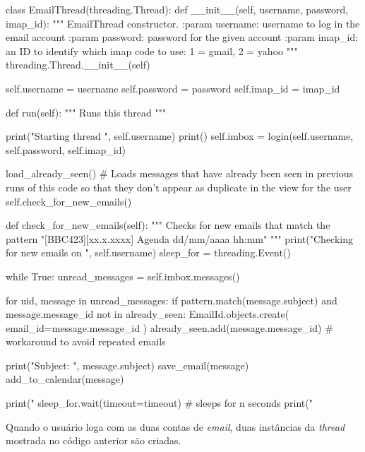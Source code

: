 \documentclass[10pt]{article}
\begin{document}
\begin{python}[breaklines=true]
class EmailThread(threading.Thread):
    def __init__(self, username, password, imap_id):
        """
        EmailThread constructor.
        :param username: username to log in the email account
        :param password: password for the given account
        :param imap_id: an ID to identify which imap code to use: 1 = gmail, 2 = yahoo
        """
        threading.Thread.__init__(self)

        self.username = username
        self.password = password
        self.imap_id = imap_id

    def run(self):
        """
        Runs this thread
        """

        print("Starting thread ", self.username)
        print()
        self.imbox = login(self.username, self.password, self.imap_id)

        load_already_seen()  # Loads messages that have already been seen in previous runs of this code so that they don't appear as duplicate in the view for the user
        self.check_for_new_emails()

    def check_for_new_emails(self):
        """
        Checks for new emails that match the pattern "[BBC423][xx.x.xxxx] Agenda dd/mm/aaaa hh:mm"
        """
        print("Checking for new emails on ", self.username)
        sleep_for = threading.Event()

        while True:
            unread_messages = self.imbox.messages()

            for uid, message in unread_messages:
                if  pattern.match(message.subject) and message.message_id not in already_seen:
                    EmailId.objects.create(
                        email_id=message.message_id
                    )
                    already_seen.add(message.message_id)  # workaround to avoid repeated emails

                    print("Subject: ", message.subject)
                    save_email(message)
                    add_to_calendar(message)

        print("%
        sleep_for.wait(timeout=timeout) # sleeps for n seconds
        print("%
\end{python}

Quando o usuário loga com as duas contas de \textit{email}, duas instâncias da \textit{thread} mostrada no código anterior são criadas.
\end{document}
